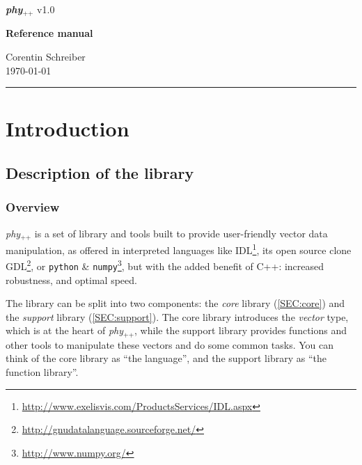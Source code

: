 \documentclass[12pt,a4paper]{report}
\newcommand{\phypp}{\textit{phy}$_{\text{++}}$\xspace}
\begin{document}
\begin{titlepage}

{\noindent \Huge \textbf{\phypp} \Large v1.0 \\[0.6cm]} \par
\noindent
\vspace{2cm}
\begin{center}
\Huge \textbf{Reference manual}
\end{center}
\null\vfill
\vspace*{1cm}
\hfill
\begin{minipage}{0.35\linewidth}
    \begin{flushright}
        \large Corentin Schreiber \\
        \today
    \end{flushright}
\end{minipage}
%
\begin{minipage}{0.02\linewidth}
    \rule{1pt}{40pt}
\end{minipage}
\end{titlepage}

\sloppy

\tableofcontents

\chapter{Introduction \label{SEC:intro}}

\section{Description of the library \label{SEC:intro:overview}}

\subsection{Overview}

\phypp is a set of library and tools built to provide user-friendly vector data manipulation, as offered in interpreted languages like IDL\footnote{\url{http://www.exelisvis.com/ProductsServices/IDL.aspx}}, its open source clone GDL\footnote{\url{http://gnudatalanguage.sourceforge.net/}}, or \texttt{python} \& \texttt{numpy}\footnote{\url{http://www.numpy.org/}}, but with the added benefit of C++: increased robustness, and optimal speed.

The library can be split into two components: the \emph{core} library (\ref{SEC:core}) and the \emph{support} library (\ref{SEC:support}). The core library introduces the \emph{vector} type, which is at the heart of \phypp, while the support library provides functions and other tools to manipulate these vectors and do some common tasks. You can think of the core library as ``the language'', and the support library as ``the function library''.
\end{document}

